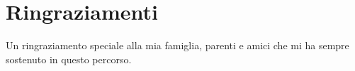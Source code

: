 

\chapter*{Ringraziamenti}
\thispagestyle{empty}
Un ringraziamento speciale alla mia famiglia, parenti e amici che mi ha sempre sostenuto in questo percorso.
